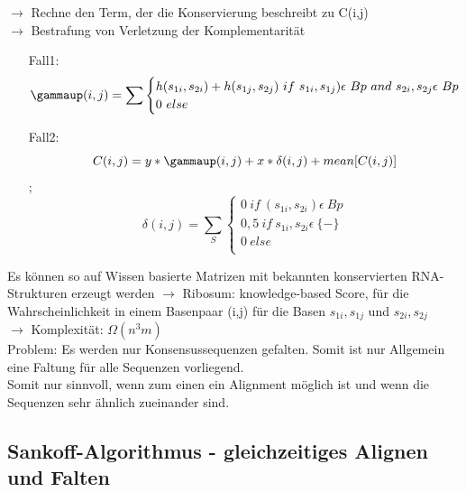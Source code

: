 $\rightarrow$  Rechne den Term, der die Konservierung beschreibt zu C(i,j) \\
$\rightarrow$ Bestrafung von Verletzung der Komplementarität\\
\begin{itemize}
	\item[Fall1:] 
	\begin{equation}
	\gammaup(i,j)= \sum 
	\begin{cases} 
	h(s_{1i},s_{2i}) + h(s_{1j},s_{2j}) \ if\ s_{1i},s_{1j}) \epsilon\ Bp \ and \ s_{2i},s_{2j} \epsilon\ Bp \\
	0 \ else\\
	\end{cases} 
	\end{equation}	
	\item [Fall2:] 
	\begin{equation} 
	C(i,j)= y * \gammaup (i,j) + x * \delta (i,j)+ mean[C(i,j)]  
	\end{equation} ;
	\begin{equation}	 
	\delta(i,j)= \sum_{S} 
	\begin{cases} 
	0 \ if\ (s_{1i},s_{2i}) \epsilon\ Bp \\
	0,5 \ if\ s_{1i},s_{2i} \epsilon\ \{-\} \\ 
	0 \ else\\
	\end{cases}
	\end{equation}
\end{itemize}

Es können so auf Wissen basierte Matrizen mit bekannten konservierten RNA-Strukturen erzeugt werden
$\rightarrow$ Ribosum: knowledge-based Score, für die Wahrscheinlichkeit in einem Basenpaar (i,j) für die Basen $s_{1i}, s_{1j}$ und $s_{2i}, s_{2j}$ \\

$\rightarrow$ Komplexität: $\Omega(n^{3}m)$ \\

Problem: Es werden nur Konsensussequenzen gefalten. Somit ist nur Allgemein eine Faltung für alle Sequenzen vorliegend. \\
Somit nur sinnvoll, wenn zum einen ein Alignment möglich ist und wenn die Sequenzen sehr ähnlich zueinander sind.

\subsection{Sankoff-Algorithmus - gleichzeitiges Alignen und Falten}

